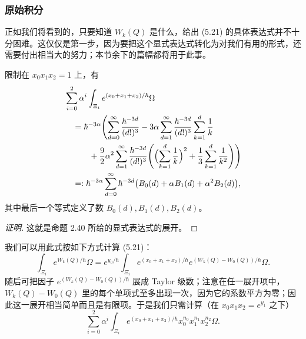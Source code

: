 \subsubsection{原始积分}

正如我们将看到的，只要知道 $W_k(Q)$ 是什么，给出 (5.21) 的具体表达式并不十分困难。这仅仅是第一步，因为要把这个显式表达式转化为对我们有用的形式，还需要付出相当大的努力；本节余下的篇幅都将用于此事。

\begin{lemma}
  限制在 $x_0x_1x_2=1$ 上，有
  \begin{align}
    &\sum_{i=0}^2\alpha^i\int_{\Xi_i}e^{(x_0+x_1+x_2)/\hbar}\Omega \notag\\
    &\quad =\hbar^{-3\alpha}\Biggl(\sum_{d=0}^{\infty}\frac{\hbar^{-3d}}{(d!)^3}
      -3\alpha\sum_{d=1}^{\infty}\frac{\hbar^{-3d}}{(d!)^3}\sum_{k=1}^{d}\frac1k \notag\\
    &\quad\qquad +\frac92\alpha^2\sum_{d=1}^{\infty}\frac{\hbar^{-3d}}{(d!)^3}
      \Biggl(\Bigl(\sum_{k=1}^{d}\frac1k\Bigr)^2+\frac13\sum_{k=1}^{d}\frac1{k^2}\Biggr)\Biggr) \notag\\
    &\quad =:\hbar^{-3\alpha}\sum_{d=0}^{\infty}\hbar^{-3d}\bigl(B_0(d)+\alpha B_1(d)+\alpha^2B_2(d)\bigr),
  \end{align}
  其中最后一个等式定义了数 $B_0(d),B_1(d),B_2(d)$。
\end{lemma}

\begin{proof}[证明]
这就是命题 2.40 所给的显式表达式的展开。
\end{proof}


我们可以用此式按如下方式计算 (5.21)：
\[
  \int_{\Xi_i}e^{W_k(Q)/\hbar}\Omega=e^{y_0/\hbar}\int_{\Xi_i}e^{(x_0+x_1+x_2)/\hbar}e^{(W_k(Q)-W_0(Q))/\hbar}\Omega.
\]
随后可把因子 $e^{(W_k(Q)-W_0(Q))/\hbar}$ 展成 Taylor 级数；注意在任一展开项中，$W_k(Q)-W_0(Q)$ 里的每个单项式至多出现一次，因为它的系数平方为零；因此这一展开相当简单而且是有限项。于是我们只需计算（在 $x_0x_1x_2=e^{y_1}$ 之下）
\[
  \sum_{i=0}^2\alpha^i\int_{\Xi_i}e^{(x_0+x_1+x_2)/\hbar}x_0^{n_0}x_1^{n_1}x_2^{n_2}\Omega.
\]

